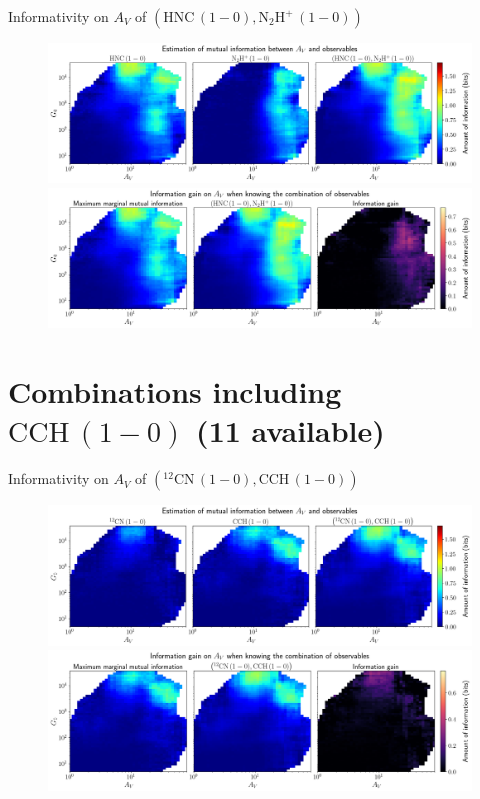 \documentclass{beamer}
\begin{document}
\begin{frame}{Informativity on $A_V$ of $\left(\mathrm{HNC\,(1-0)},\mathrm{N_2H^+\,(1-0)}\right)$}
    \begin{figure}
        \centering
        \includegraphics[width=0.95\linewidth]{../mi/av__hnc10_n2hp10_mi.png}
        \vfill
        \includegraphics[width=0.95\linewidth]{../mi/av__hnc10_n2hp10_mi_gain.png}
    \end{figure}
\end{frame}

\section{Combinations including $\mathrm{CCH\,(1-0)}$ (11 available)}

\begin{frame}{Informativity on $A_V$ of $\left(\mathrm{^{12}CN\,(1-0)},\mathrm{CCH\,(1-0)}\right)$}
    \begin{figure}
        \centering
        \includegraphics[width=0.95\linewidth]{../mi/av__12cn10_cch10_mi.png}
        \vfill
        \includegraphics[width=0.95\linewidth]{../mi/av__12cn10_cch10_mi_gain.png}
    \end{figure}
\end{frame}
\end{document}
